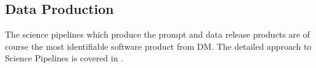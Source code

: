\subsection{Data Production} \label{sec:dataproduction}
The science pipelines which produce the prompt and data release products are of course the most identifiable
software product from DM.
The detailed approach to Science Pipelines is covered in \citet{PSTN-019}.


